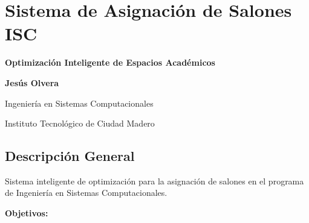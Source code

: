 \documentclass[algorithms,article,submit,pdftex]{Definitions/mdpi}
\begin{document}
\section{Sistema de Asignación de Salones ISC}

\textbf{Optimización Inteligente de Espacios Académicos}

\textbf{Jesús Olvera}

Ingeniería en Sistemas Computacionales

Instituto Tecnológico de Ciudad Madero


\subsection{Descripción General}

Sistema inteligente de optimización para la asignación de salones en el programa de Ingeniería en Sistemas Computacionales.

\textbf{Objetivos:}
\end{document}

